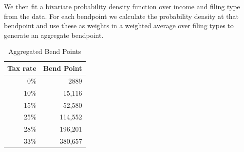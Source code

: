 \documentclass[12pt]{report}
\theoremstyle{definition}
\begin{document}
      We then fit a bivariate probability density function over income and filing type from the data.  For each bendpoint we calculate the probability density at that bendpoint and use these as weights in a weighted average over filing types to generate an aggregate bendpoint.
      \begin{table}[ht]
        \caption{Aggregated Bend Points}
        \label{Calib_Bend_Tab2}
        \centering
        \begin{tabular}{|r|r|} \hline 
          Tax rate & Bend Point \\ \hline 
          0\% & 2889 \\ \hline 
          10\% & 15,116 \\ \hline 
          15\% & 52,580 \\ \hline 
          25\% & 114,552 \\ \hline 
          28\% & 196,201 \\ \hline 
          33\% & 380,657 \\ \hline 
        \end{tabular}
      \end{table}

\clearpage

%  

\printindex
\end{document}
